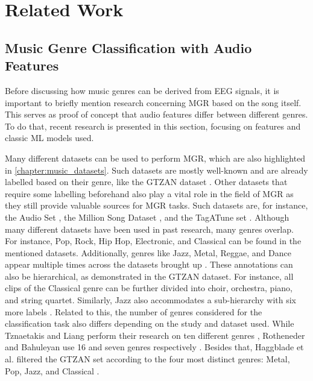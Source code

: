 \chapter{Related Work}\label{chapter:related_work}
\acresetall
  \section{Music Genre Classification with Audio Features}
    Before discussing how music genres can be derived from \ac{EEG} signals, it is important to briefly mention research concerning \ac{MGR} based on the song itself. This serves as proof of concept that audio features differ between different genres. To do that, recent research is presented in this section, focusing on features and classic \ac{ML} models used. \par

    Many different datasets can be used to perform \ac{MGR}, which are also highlighted in \autoref{chapter:music_datasets}. Such datasets are mostly well-known and are already labelled based on their genre, like the GTZAN dataset \cite{tzanetakis2002musical}. Other datasets that require some labelling beforehand also play a vital role in the field of \ac{MGR} as they still provide valuable sources for \ac{MGR} tasks. Such datasets are, for instance, the Audio Set \cite{bahuleyan2018music,gemmeke2017}, the Million Song Dataset \cite{bertin2011million,liang2011music}, and the TagATune set \cite{law2009evaluation,rotheneder2023explanation}. Although many different datasets have been used in past research, many genres overlap. For instance, Pop, Rock, Hip Hop, Electronic, and Classical can be found in the mentioned datasets. Additionally, genres like Jazz, Metal, Reggae, and Dance appear multiple times across the datasets brought up \cite{gemmeke2017,law2009evaluation,tzanetakis2002musical}. These annotations can also be hierarchical, as demonstrated in the GTZAN dataset. For instance, all clips of the Classical genre can be further divided into choir, orchestra, piano, and string quartet. Similarly, Jazz also accommodates a sub-hierarchy with six more labels \cite{tzanetakis2002musical}. Related to this, the number of genres considered for the classification task also differs depending on the study and dataset used. While Tznaetakis and Liang perform their research on ten different genres \cite{liang2011music,tzanetakis2002musical}, Rotheneder and Bahuleyan use 16 and seven genres respectively \cite{bahuleyan2018music,rotheneder2023explanation}. Besides that, Haggblade et al. filtered the GTZAN set according to the four most distinct genres: Metal, Pop, Jazz, and Classical \cite{haggblade2011music}.

